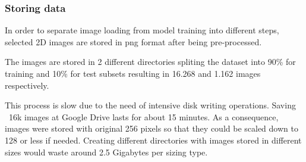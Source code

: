 \newpage

\subsubsection*{Storing data}

In order to separate image loading from model training into different steps, selected 2D images are stored in \acrshort{png} format after being pre-processed. 

The images are stored in 2 different directories spliting the dataset into 90\% for training and 10\% for test subsets resulting in 16.268 and 1.162 images respectively.

This process is slow due to the need of intensive disk writing operations. Saving ~16k images at Google Drive lasts for about 15 minutes. As a consequence, images were stored with original 256 pixels so that they could be scaled down to 128 or less if needed. Creating different directories with images stored in different sizes would waste around 2.5 Gigabytes per sizing type.